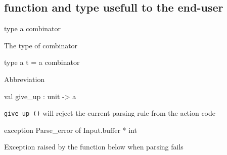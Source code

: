 \documentclass[11pt]{article}
\begin{document}
\subsection{function and type usefull to the end-user}




\label{type:Combinator.combinator}\begin{ocamldoccode}
type {\textquotesingle}a combinator 
\end{ocamldoccode}
\begin{ocamldocdescription}
The type of combinator


\end{ocamldocdescription}




\label{type:Combinator.t}\begin{ocamldoccode}
type {\textquotesingle}a t = {\textquotesingle}a combinator 
\end{ocamldoccode}
\begin{ocamldocdescription}
Abbreviation


\end{ocamldocdescription}




\label{val:Combinator.give-underscoreup}\begin{ocamldoccode}
val give_up : unit -> {\textquotesingle}a
\end{ocamldoccode}
\begin{ocamldocdescription}
{\tt{give\_up ()}} will reject the current parsing rule from the action code


\end{ocamldocdescription}




\label{exception:Combinator.Parse-underscoreerror}\begin{ocamldoccode}
exception Parse_error of Input.buffer * int
\end{ocamldoccode}
\begin{ocamldocdescription}
Exception raised by the function below when parsing fails


\end{ocamldocdescription}
\end{document}
